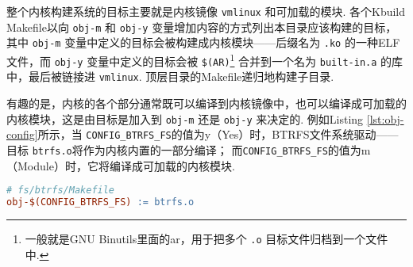整个内核构建系统的目标主要就是内核镜像 \lstinline{vmlinux} 和可加载的模块.
各个Kbuild Makefile以向 \lstinline{obj-m} 和 \lstinline{obj-y} 变量增加内容的方式列出本目录应该构建的目标，
其中 \lstinline{obj-m} 变量中定义的目标会被构建成内核模块——后缀名为 \lstinline{.ko} 的一种ELF文件，而 \lstinline{obj-y} 变量中定义的目标会被 \lstinline{$(AR)}\footnote{一般就是GNU Binutils里面的ar，用于把多个 \lstinline{.o} 目标文件归档到一个文件中.} 合并到一个名为 \lstinline{built-in.a} 的库中，最后被链接进 \lstinline{vmlinux}.
顶层目录的Makefile递归地构建子目录.

有趣的是，内核的各个部分通常既可以编译到内核镜像中，也可以编译成可加载的内核模块，这是由目标是加入到 \lstinline{obj-m} 还是 \lstinline{obj-y} 来决定的.
例如Listing \ref{lst:obj-config}所示，当 \lstinline{CONFIG_BTRFS_FS}的值为y（Yes）时，BTRFS文件系统驱动——目标 \lstinline{btrfs.o}将作为内核内置的一部分编译；
而\lstinline{CONFIG_BTRFS_FS}的值为m（Module）时，它将编译成可加载的内核模块.

\begin{lstlisting}[language=make, caption=可配置的编译目标, label=lst:obj-config]
# fs/btrfs/Makefile
obj-$(CONFIG_BTRFS_FS) := btrfs.o
\end{lstlisting}
